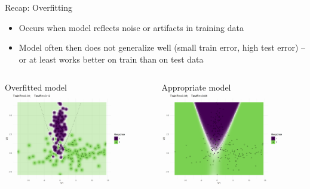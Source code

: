 \documentclass[11pt,compress,t,notes=noshow, xcolor=table]{beamer}
\begin{document}
\begin{vbframe}{Recap: Overfitting}


\begin{itemize}
  \item Occurs when model reflects noise or artifacts in training data 
  \item Model often then does not generalize well
  (small train error, high test error) -- or at least works better on train than on test data
\end{itemize}
\lz  \lz
\begin{columns}
\begin{column}{0.5\textwidth}
  \raggedright
  Overfitted model\\
  \includegraphics[width=0.85\textwidth]{figure/model_eval_02.png}
\end{column}
\begin{column}{0.5\textwidth}
  \raggedright
    Appropriate model\\
  \includegraphics[width=0.85\textwidth]{figure/model_eval_01.png}
\end{column}
\end{columns}
    
\end{vbframe}
\end{document}
